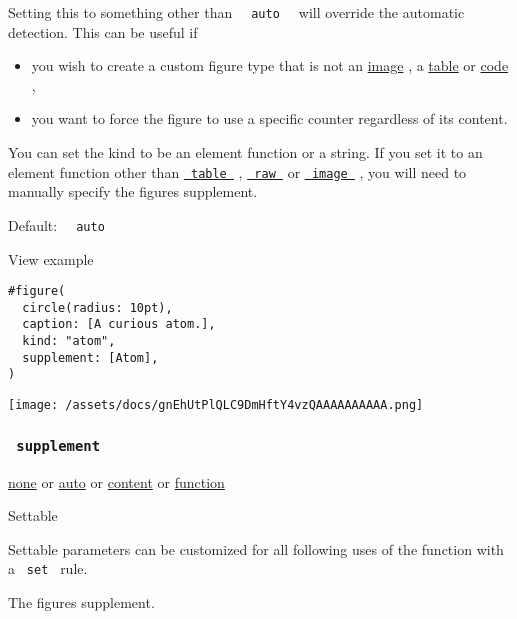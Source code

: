 Setting this to something other than
\texttt{\ }{\texttt{\ auto\ }}\texttt{\ } will override the automatic
detection. This can be useful if

\begin{itemize}
\tightlist
\item
  you wish to create a custom figure type that is not an
  \href{/docs/reference/visualize/image/}{image} , a
  \href{/docs/reference/model/table/}{table} or
  \href{/docs/reference/text/raw/}{code} ,
\item
  you want to force the figure to use a specific counter regardless of
  its content.
\end{itemize}

You can set the kind to be an element function or a string. If you set
it to an element function other than
\href{/docs/reference/model/table/}{\texttt{\ table\ }} ,
\href{/docs/reference/text/raw/}{\texttt{\ raw\ }} or
\href{/docs/reference/visualize/image/}{\texttt{\ image\ }} , you will
need to manually specify the figure\textquotesingle s supplement.

Default: \texttt{\ }{\texttt{\ auto\ }}\texttt{\ }


View example

\begin{verbatim}
#figure(
  circle(radius: 10pt),
  caption: [A curious atom.],
  kind: "atom",
  supplement: [Atom],
)
\end{verbatim}

\texttt{[image: /assets/docs/gnEhUtPlQLC9DmHftY4vzQAAAAAAAAAA.png]}

\subsubsection{\texorpdfstring{\texttt{\ supplement\ }}{ supplement }}\label{parameters-supplement}

\href{/docs/reference/foundations/none/}{none} {or}
\href{/docs/reference/foundations/auto/}{auto} {or}
\href{/docs/reference/foundations/content/}{content} {or}
\href{/docs/reference/foundations/function/}{function}

{{ Settable }}

\label{parameters-supplement-settable-tooltip}
Settable parameters can be customized for all following uses of the
function with a \texttt{\ set\ } rule.

The figure\textquotesingle s supplement.


